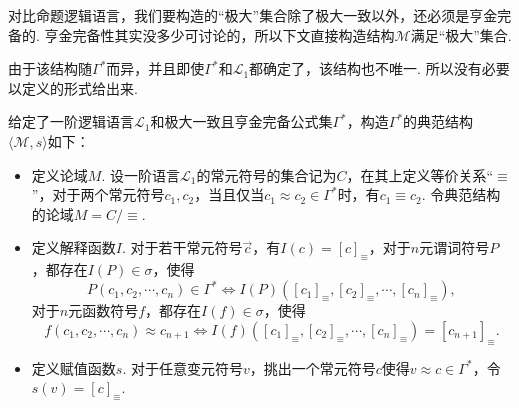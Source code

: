 对比命题逻辑语言，我们要构造的“极大”集合除了极大一致以外，还必须是亨金完备的. 亨金完备性其实没多少可讨论的，所以下文直接构造结构$\mathcal{M}$满足“极大”集合.

由于该结构随$\Gamma^*$而异，并且即使$\Gamma^*$和$\mathcal{L}_1$都确定了，该结构也不唯一. 所以没有必要以定义的形式给出来. 

\begin{reference}
    给定了一阶逻辑语言$\mathcal{L}_1$和极大一致且亨金完备公式集$\Gamma^*$，构造$\Gamma^*$的典范结构$\langle \mathcal{M}, s \rangle$如下：
    \begin{itemize}
        \item 定义论域$M$. 设一阶语言$\mathcal{L}_1$的常元符号的集合记为$C$，在其上定义等价关系“$\equiv$”，对于两个常元符号$c_1,c_2$，当且仅当$c_1 \approx c_2 \in \Gamma^*$时，有$c_1 \equiv c_2$. 令典范结构的论域$M=C/\equiv$.
        \item 定义解释函数$I$. 对于若干常元符号$\vec{c}$，有$I(c)=[c]_{\equiv}$，对于$n$元谓词符号$P$，都存在$I(P) \in \sigma$，使得
        $$ P(c_1,c_2,\cdots, c_n) \in \Gamma^* \Longleftrightarrow I(P)([c_1]_{\equiv}, [c_2]_{\equiv}, \cdots, [c_n]_{\equiv}), $$
        对于$n$元函数符号$f$，都存在$I(f) \in \sigma$，使得
        $$ f(c_1,c_2,\cdots, c_n) \approx c_{n+1} \Longleftrightarrow I(f)([c_1]_{\equiv}, [c_2]_{\equiv}, \cdots, [c_n]_{\equiv}) = [c_{n+1}]_{\equiv}.$$
        \item 定义赋值函数$s$. 对于任意变元符号$v$，挑出一个常元符号$c$使得$v \approx c \in \Gamma^*$，令$s(v) = [c]_{\equiv}$.
    \end{itemize}
\end{reference}

